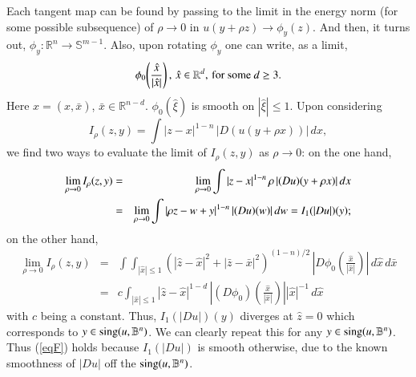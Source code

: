 \documentclass[12pt]{amsart}
\begin{document}
Each tangent map can be found by passing to the limit in the energy norm (for some possible subsequence) of $\rho \to 0$ in
$u(y+\rho z)\to\phi_y(z)$. And then, it turns out, $\phi_y:\mathbb R^n\to\mathbb{S}^{m-1}$. Also, upon rotating $\phi_y$ one can write, as a limit,
\begin{equation} \notag
\phi_0 \! \left(\frac{\hat{x}}{|\hat{x}|}\right), \, \hat{x} \in \mathbb R^d, \, \text{for some $d \geq 3$}.
\end{equation}
Here $x = (\hat{x}, \bar{x})$, $\bar{x} \in \mathbb R^{n-d}$. $\phi_0(\hat{\xi})$ is smooth on $|\hat{\xi}| \leq 1$. Upon considering
$$
I_\rho(z,y)=\int |z-x|^{1-n} \, |D(u(y+\rho x))| \, dx,
$$
we find two ways to evaluate the limit of $I_\rho(z,y)$ as $\rho\to 0$: on the one hand,
\begin{eqnarray*}
\lim_{\rho\to 0}I_\rho(z,y)&=& \lim_{\rho\to 0}\int |z-x|^{1-n} \, \rho \, |(Du)(y + \rho x)| \, dx\\
&=& \lim_{\rho\to 0}\int |\rho z - w + y|^{1-n} \, |(Du)(w)| \, dw=I_1(|Du|)(y);\notag
\end{eqnarray*}
on the other hand,
\begin{eqnarray*}
\lim_{\rho\to 0}I_\rho(z,y)&=&\int \int_{|\hat{x}| \leq 1} \left(|\hat{z} - \hat{x}|^2 + |\bar{z} - \bar{x}|^2\right)^{(1-n)/2} \, \left|D\phi_0 \left(\frac{\hat{x}}{|\hat{x}|}\right)\right| \, d\hat{x} \, d\bar{x}\\
&=& c \int_{|\hat{x}| \leq 1} |\hat{z} - \hat{x}|^{1-d} \, \left|(D\phi_0)\left(\frac{\hat{x}}{|\hat{x}|}\right)\right| |\hat{x}|^{-1} \, d\hat{x}
\end{eqnarray*}
with $c$ being a constant. Thus, $I_1(|Du|)(y)$ diverges at $\hat{z}=0$ which corresponds to $y \in\hbox{sing} (u,\mathbb B^n)$. We can clearly repeat this for any $y\in \hbox{sing}(u,\mathbb B^n)$.  Thus (\ref{eqF}) holds because $I_1(|Du|)$ is smooth otherwise, due to the known smoothness of $|Du|$ off the $\hbox{sing}(u,\mathbb B^n)$.
\end{document}
